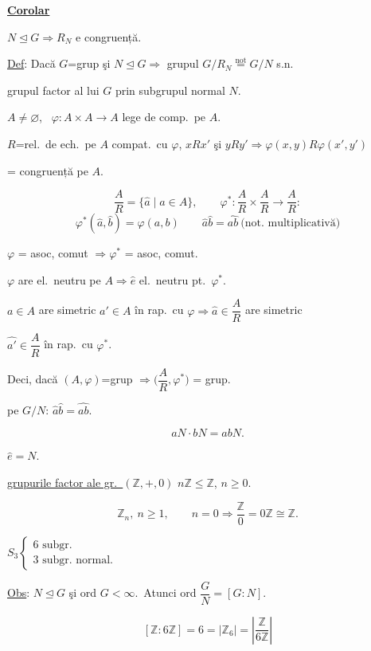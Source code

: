 \documentclass[12pt]{article}
\begin{document}
\noindent\underline{\textbf{Corolar}}

\bigskip
\noindent $N\trianglelefteq G \Rightarrow R_N$ e congruență.

\bigskip
\noindent\underline{Def}: Dacă $G$=grup şi $N\trianglelefteq G \Rightarrow$ grupul $G/R_N \overset{\text{not}}{=} G/N$ s.n.

\noindent grupul factor al lui $G$ prin subgrupul normal $N$.

\bigskip
\noindent $A\neq\varnothing$, \ $\varphi: A\times A\to A$ lege de comp.\ pe $A$.

\noindent $R$=rel.\ de ech.\ pe $A$ compat.\ cu $\varphi$, \quad $xRx'$ şi $yRy' \Rightarrow \varphi(x,y)R\varphi(x',y')$

\noindent = congruență pe $A$.

\[
\frac{A}{R} = \{\hat a \mid a\in A\}, \qquad \varphi^*: \frac{A}{R}\times\frac{A}{R} \to \frac{A}{R}:
\]
\[
\varphi^*(\hat a,\hat b) = \varphi(a,b) \qquad \hat a\hat b=\widehat{ab} \ \text{(not.\ multiplicativă)}
\]

\bigskip
\noindent $\varphi$ = asoc, comut $\Rightarrow \varphi^*$ = asoc, comut.

\noindent $\varphi$ are el.\ neutru pe $A \Rightarrow \hat e$ el.\ neutru pt.\ $\varphi^*$.

\noindent $a\in A$ are simetric $a'\in A$ în rap.\ cu $\varphi \Rightarrow \hat a\in \dfrac{A}{R}$ are simetric

\noindent $\hat{a'}\in \dfrac{A}{R}$ în rap.\ cu $\varphi^*$.

\bigskip
\noindent Deci, dacă $(A,\varphi)$=grup $\Rightarrow \Big(\dfrac{A}{R},\varphi^*\Big)$ = grup.

\bigskip
\noindent pe $G/N$: \quad $\hat a\hat b = \widehat{ab}$.

\[
aN\cdot bN = abN.
\]

\noindent $\hat e = N$.

\bigskip
\noindent\underline{grupurile factor ale gr.\ $(\mathbb{Z},+,0)$} \quad $n\mathbb{Z}\leq \mathbb{Z}$, $n\geq 0$.

\[
\mathbb{Z}_n, \ n\geq 1, \qquad n=0 \Rightarrow \frac{\mathbb{Z}}{0} = 0\mathbb{Z} \cong \mathbb{Z}.
\]

\noindent $S_3 \begin{cases} 6 \text{ subgr.} \\ 3 \text{ subgr.\ normal.} \end{cases}$

\bigskip
\noindent\underline{Obs}: $N\trianglelefteq G$ şi ord $G<\infty$.\ Atunci ord $\dfrac{G}{N} = [G:N]$.

\[
[\mathbb{Z}:6\mathbb{Z}] = 6 = |\mathbb{Z}_6| = \left|\frac{\mathbb{Z}}{6\mathbb{Z}}\right|
\]
\end{document}
